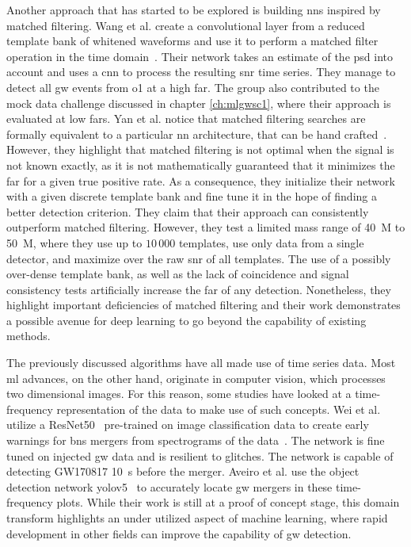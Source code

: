 Another approach that has started to be explored is building \acrshort{nn}s inspired by matched filtering. Wang et al. create a convolutional layer from a reduced template bank of whitened waveforms and use it to perform a matched filter operation in the time domain~\cite{Wang:2019zaj}. Their network takes an estimate of the \acrshort{psd} into account and uses a \acrshort{cnn} to process the resulting \acrshort{snr} time series. They manage to detect all \acrshort{gw} events from \acrshort{o1} at a high \acrshort{far}. The group also contributed to the mock data challenge discussed in chapter \ref{ch:mlgwsc1}, where their approach is evaluated at low \acrshort{far}s. Yan et al. notice that matched filtering searches are formally equivalent to a particular \acrshort{nn} architecture, that can be hand crafted~\cite{Yan:2021wml}. However, they highlight that matched filtering is not optimal when the signal is not known exactly, as it is not mathematically guaranteed that it minimizes the \acrshort{far} for a given true positive rate. As a consequence, they initialize their network with a given discrete template bank and fine tune it in the hope of finding a better detection criterion. They claim that their approach can consistently outperform matched filtering. However, they test a limited mass range of \SI{40}{M_\odot} to \SI{50}{M_\odot}, where they use up to $10\,000$ templates, use only data from a single detector, and maximize over the raw \acrshort{snr} of all templates. The use of a possibly over-dense template bank, as well as the lack of coincidence and signal consistency tests artificially increase the \acrshort{far} of any detection. Nonetheless, they highlight important deficiencies of matched filtering and their work demonstrates a possible avenue for deep learning to go beyond the capability of existing methods.

The previously discussed algorithms have all made use of time series data. Most \acrshort{ml} advances, on the other hand, originate in computer vision, which processes two dimensional images. For this reason, some studies have looked at a time-frequency representation of the data to make use of such concepts. Wei et al. utilize a ResNet50~\cite{He:2015aaa} pre-trained on image classification data to create early warnings for \acrshort{bns} mergers from spectrograms of the data~\cite{Wei:2020sfz}. The network is fine tuned on injected \acrshort{gw} data and is resilient to glitches. The network is capable of detecting GW170817 \SI{10}{\second} before the merger. Aveiro et al. use the object detection network \acrshort{yolo}v5~\cite{Jocher:2022aaa} to accurately locate \acrshort{gw} mergers in these time-frequency plots. While their work is still at a proof of concept stage, this domain transform highlights an under utilized aspect of machine learning, where rapid development in other fields can improve the capability of \acrshort{gw} detection.

